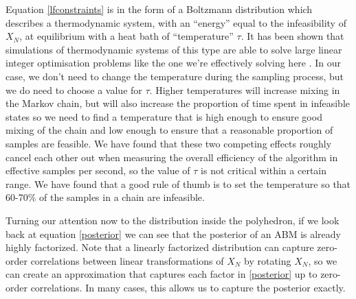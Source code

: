 \documentclass{article}
\begin{document}
Equation \eqref{lfconstraints} is in the form of a Boltzmann distribution which describes a thermodynamic system, with an ``energy'' equal to the infeasibility of $X_N$, at equilibrium with a heat bath of ``temperature'' $\tau$. It has been shown that simulations of thermodynamic systems of this type are able to solve large linear integer optimisation problems like the one we're effectively solving here \citep{kirkpatrick1983optimization}. In our case, we don't need to change the temperature during the sampling process, but we do need to choose a value for $\tau$. Higher temperatures will increase mixing in the Markov chain, but will also increase the proportion of time spent in infeasible states so we need to find a temperature that is high enough to ensure good mixing of the chain and low enough to ensure that a reasonable proportion of samples are feasible. We have found that these two competing effects roughly cancel each other out when measuring the overall efficiency of the algorithm in effective samples per second, so the value of $\tau$ is not critical within a certain range. We have found that a good rule of thumb is to set the temperature so that 60-70\% of the samples in a chain are infeasible.

Turning our attention now to the distribution inside the polyhedron, if we look back at equation \eqref{posterior} we can see that the posterior of an ABM is already highly factorized. Note that a linearly factorized distribution can capture zero-order correlations between linear transformations of $X_N$ by rotating $X_N$, so we can create an approximation that captures each factor in \eqref{posterior} up to zero-order correlations. In many cases, this allows us to capture the posterior exactly.
\end{document}
